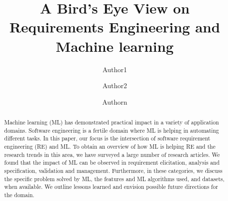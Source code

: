 \documentclass{llncs}
\begin{document}
\frontmatter          %
\mainmatter              %

\title{A Bird’s Eye View on Requirements Engineering and Machine learning} 

 
\author{Author1 \and Author2 \and Authorn} \authorrunning{} %
%

\maketitle              %
\begin{abstract}
Machine learning (ML) has demonstrated practical impact in a variety of application domains. Software engineering is a fertile domain where ML is helping in automating  different tasks. In this paper, our focus is the intersection of software requirement engineering (RE) and ML.  To obtain an overview of how ML is helping RE and the research trends in this area, we have surveyed a large number of research articles. We found that the impact of ML can be observed in requirement elicitation, analysis and specification, validation and management. Furthermore, in these categories, we discuss the specific problem solved by ML, the features and ML algorithms used, and datasets, when available. We outline lessons learned and envision possible future directions for the domain.
\end{abstract}
%  
 







 
 
 
 
\end{document}
